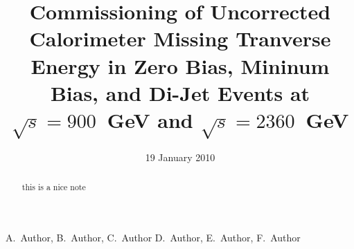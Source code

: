 
\begin{titlepage}

   \date{19 January 2010}

  \title{Commissioning of Uncorrected Calorimeter Missing Tranverse Energy in Zero Bias, Mininum Bias, and Di-Jet Events at $\sqrt{s}=900$~GeV and $\sqrt{s}=2360$~GeV}

  \begin{Authlist}
    A.~Author, B.~Author, C.~Author
    D.~Author, E.~Author, F.~Author
  \end{Authlist}



  \begin{abstract}
this is a nice note
  \end{abstract} 

  
\end{titlepage}

\setcounter{page}{2}%

%
%
%
%
%  
%

